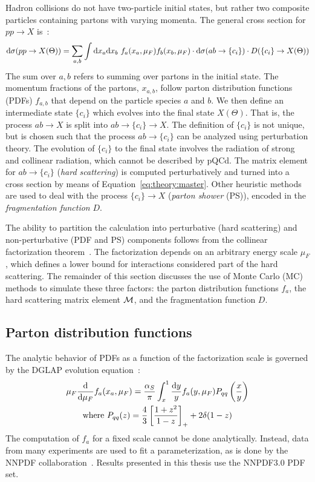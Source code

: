 Hadron collisions do not have two-particle initial states, but rather two composite particles containing partons with varying momenta. 
The general cross section for $pp\rightarrow X$ is~\cite{tasi009}:
\begin{equation}
\mathrm{d}\sigma(pp\rightarrow X(\Theta)) = 
    \sum_{a,b} \int \mathrm{d}x_a \mathrm{d}x_b 
    ~f_a(x_a,\mu_F) f_b(x_b,\mu_F) 
    \cdot \mathrm{d}\sigma(ab\rightarrow\{c_i\}) 
    \cdot D(\{c_i\}\rightarrow X(\Theta))
    \label{eq:theory:master}
\end{equation}
The sum over $a,b$ refers to summing over partons in the initial state.
The momentum fractions of the partons, $x_{a,b}$, follow parton distribution functions (PDFs) $f_{a,b}$ that depend on the particle species $a$ and $b$. 
We then define an intermediate state $\{c_i\}$ which evolves into the final state $X(\Theta)$.
That is, the process $ab\rightarrow X$ is split into $ab\rightarrow \{c_i\} \rightarrow X$.
The definition of $\{c_i\}$ is not unique, but is chosen such that the process $ab\rightarrow\{c_i\}$ can be analyzed using perturbation theory.
The evolution of $\{c_i\}$ to the final state involves the radiation of strong and collinear radiation, which cannot be described by pQCd.
The matrix element for $ab\rightarrow\{c_i\}$  (\emph{hard scattering}) is computed perturbatively and turned into a cross section by means of Equation~\ref{eq:theory:master}.
Other heuristic methods are used to deal with the process $\{c_i\}\rightarrow X$ (\emph{parton shower} (PS)), encoded in the \emph{fragmentation function} $D$. 

The ability to partition the calculation into perturbative (hard scattering) and non-perturbative (PDF and PS) components follows from the collinear factorization theorem~\cite{fact}.
The factorization depends on an arbitrary energy scale $\mu_F$, which defines a lower bound for interactions considered part of the hard scattering. 
The remainder of this section discusses the use of Monte Carlo (MC) methods to simulate these three factors: the parton distribution functions $f_a$, the hard scattering matrix element $\mathcal{M}$, and the fragmentation function $D$.

\subsection{Parton distribution functions}
The analytic behavior of PDFs as a function of the factorization scale is governed by the DGLAP evolution equation~\cite{dglap1,dglap2,dglap3}:
\begin{gather}
    \mu_F \frac{\mathrm{d}}{\mathrm{d}\mu_F} f_a(x_a,\mu_F) = \frac{\alpha_S}{\pi} \int_x^1 \frac{\mathrm{d} y}{y} f_a(y,\mu_F) P_{qq} \left(\frac{x}{y}\right) \\
    \text{where } P_{qq}(z) = \frac{4}{3}\left[\frac{1+z^2}{1-z}\right]_+ + 2\delta(1-z) \nonumber 
    \label{eq:theory:dglap}
\end{gather}
The computation of $f_a$ for a fixed scale cannot be done analytically.
Instead, data from many experiments are used to fit a parameterization, as is done by the NNPDF collaboration~\cite{nnpdf}.
Results presented in this thesis use the NNPDF3.0 PDF set.

